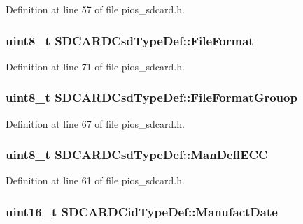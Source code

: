 \-Definition at line 57 of file pios\-\_\-sdcard.\-h.

\hypertarget{group___p_i_o_s___s_d_c_a_r_d_gaf227b9cb873b11bbee9ce41d8bcaa3d1}{
\subsubsection[{\-File\-Format}]{\setlength{\rightskip}{0pt plus 5cm}uint8\-\_\-t {\bf \-S\-D\-C\-A\-R\-D\-Csd\-Type\-Def\-::\-File\-Format}}}\label{group___p_i_o_s___s_d_c_a_r_d_gaf227b9cb873b11bbee9ce41d8bcaa3d1}


\-Definition at line 71 of file pios\-\_\-sdcard.\-h.

\hypertarget{group___p_i_o_s___s_d_c_a_r_d_ga19785f76dae23ac16c7af85cc6c88460}{
\subsubsection[{\-File\-Format\-Grouop}]{\setlength{\rightskip}{0pt plus 5cm}uint8\-\_\-t {\bf \-S\-D\-C\-A\-R\-D\-Csd\-Type\-Def\-::\-File\-Format\-Grouop}}}\label{group___p_i_o_s___s_d_c_a_r_d_ga19785f76dae23ac16c7af85cc6c88460}


\-Definition at line 67 of file pios\-\_\-sdcard.\-h.

\hypertarget{group___p_i_o_s___s_d_c_a_r_d_ga638d0d0306f38092eba2d405639c2099}{
\subsubsection[{\-Man\-Defl\-E\-C\-C}]{\setlength{\rightskip}{0pt plus 5cm}uint8\-\_\-t {\bf \-S\-D\-C\-A\-R\-D\-Csd\-Type\-Def\-::\-Man\-Defl\-E\-C\-C}}}\label{group___p_i_o_s___s_d_c_a_r_d_ga638d0d0306f38092eba2d405639c2099}


\-Definition at line 61 of file pios\-\_\-sdcard.\-h.

\hypertarget{group___p_i_o_s___s_d_c_a_r_d_gae7c9d488577977c2c5c2baca30ca6cec}{
\subsubsection[{\-Manufact\-Date}]{\setlength{\rightskip}{0pt plus 5cm}uint16\-\_\-t {\bf \-S\-D\-C\-A\-R\-D\-Cid\-Type\-Def\-::\-Manufact\-Date}}}\label{group___p_i_o_s___s_d_c_a_r_d_gae7c9d488577977c2c5c2baca30ca6cec}



